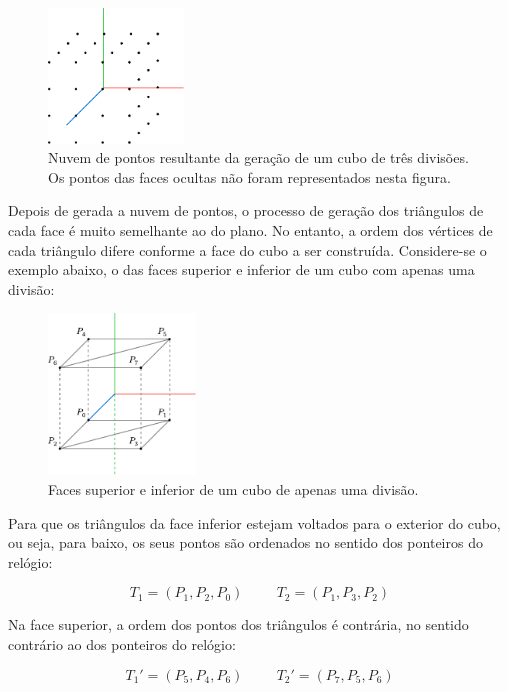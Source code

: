 \documentclass[12pt, a4paper]{article}
\begin{document}
\begin{figure}[H]
    \centering
    \includegraphics[width=0.32\textwidth]{res/figures/CubePoints.pdf}
    \caption{
        \onehalfspacing
        Nuvem de pontos resultante da geração de um cubo de três divisões. Os pontos das faces
        ocultas não foram representados nesta figura.
    }
\end{figure}

Depois de gerada a nuvem de pontos, o processo de geração dos triângulos de cada face é muito
semelhante ao do plano. No entanto, a ordem dos vértices de cada triângulo difere conforme a face do
cubo a ser construída. Considere-se o exemplo abaixo, o das faces superior e inferior de um cubo com
apenas uma divisão:

\begin{figure}[H]
    \centering
    \includegraphics[width=0.35\textwidth]{res/figures/CubeFaces.pdf}
    \caption{Faces superior e inferior de um cubo de apenas uma divisão.}
\end{figure}

Para que os triângulos da face inferior estejam voltados para o exterior do cubo, ou seja, para
baixo, os seus pontos são ordenados no sentido dos ponteiros do relógio:

$$
T_1 = (P_1, P_2, P_0)
\hspace{1cm}
T_2 = (P_1, P_3, P_2)
$$

Na face superior, a ordem dos pontos dos triângulos é contrária, no sentido contrário ao dos
ponteiros do relógio:

$$
T_1' = (P_5, P_4, P_6)
\hspace{1cm}
T_2' = (P_7, P_5, P_6)
$$
\end{document}
